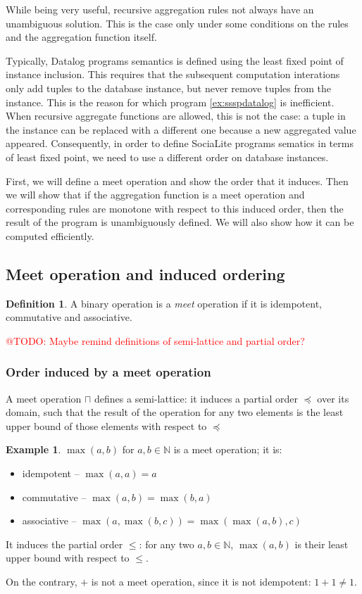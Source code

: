 \documentclass{pracamgr}
\makeatletter
\theoremstyle{plain}
\theoremstyle{definition}
\newtheorem{defn}{Definition}[section]
\newtheorem{exmp}{Example}[section]
\theoremstyle{remark}
\newcommand{\todo}[1]{\textcolor{red}{@TODO: #1}}
\makeatother
\begin{document}
While being very useful, recursive aggregation rules not always have an unambiguous solution. This is the case only under some conditions on the rules and the aggregation function itself.

Typically, Datalog programs semantics is defined using the least fixed point of instance inclusion. This requires that the subsequent computation interations only add tuples to the database instance, but never remove tuples from the instance. This is the reason for which program \ref{ex:ssspdatalog} is inefficient. When recursive aggregate functions are allowed, this is not the case: a tuple in the instance can be replaced with a different one because a new aggregated value appeared. Consequently, in order to define SociaLite programs sematics in terms of least fixed point, we need to use a different order on database instances.

First, we will define a meet operation and show the order that it induces. Then we will show that if the aggregation function is a meet operation and corresponding rules are monotone with respect to this induced order, then the result of the program is unambiguously defined. We will also show how it can be computed efficiently.

\subsection{Meet operation and induced ordering}
\begin{defn}
A binary operation is a \emph{meet} operation if it is idempotent, commutative and associative.
\end{defn}
\todo{Maybe remind definitions of semi-lattice and partial order?}

\subsubsection{Order induced by a meet operation}

A meet operation $\sqcap$ defines a semi-lattice: it induces a partial order $\preceq$ over its domain, such that the result of the operation for any two elements is the least upper bound of those elements with respect to $\preceq$

\begin{exmp}
$\max(a, b)$ for $a, b \in \mathbb{N}$ is a meet operation; it is:
\begin{itemize}
\item idempotent -- $\max(a, a) = a$
\item commutative -- $\max(a, b) = \max(b, a)$
\item associative -- $\max(a, \max(b, c)) = \max(\max(a, b), c)$
\end{itemize}
It induces the partial order $\le$: for any two $a, b \in \mathbb{N}$, $\max(a, b)$ is their least upper bound with respect to $\le$.


On the contrary, $+$ is not a meet operation, since it is not idempotent: $1+1 \ne 1$.
\end{exmp}
\end{document}

